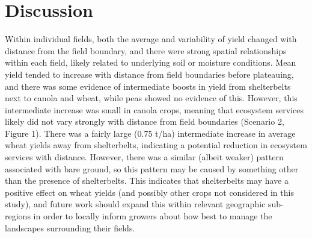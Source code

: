 \documentclass[]{elsarticle} %
\begin{document}
\hypertarget{discussion}{%
\section{Discussion}\label{discussion}}

Within individual fields, both the average and variability of yield changed with distance from the field boundary, and there were strong spatial relationships within each field, likely related to underlying soil or moisture conditions.
Mean yield tended to increase with distance from field boundaries before plateauing, and there was some evidence of intermediate boosts in yield from shelterbelts next to canola and wheat, while peas showed no evidence of this.
However, this intermediate increase was small in canola crops, meaning that ecosystem services likely did not vary strongly with distance from field boundaries (Scenario 2, Figure 1).
There was a fairly large (0.75 t/ha) intermediate increase in average wheat yields away from shelterbelts, indicating a potential reduction in ecosystem services with distance.
However, there was a similar (albeit weaker) pattern associated with bare ground, so this pattern may be caused by something other than the presence of shelterbelts.
This indicates that shelterbelts may have a positive effect on wheat yields (and possibly other crops not considered in this study), and future work should expand this within relevant geographic sub-regions in order to locally inform growers about how best to manage the landscapes surrounding their fields.
\end{document}
